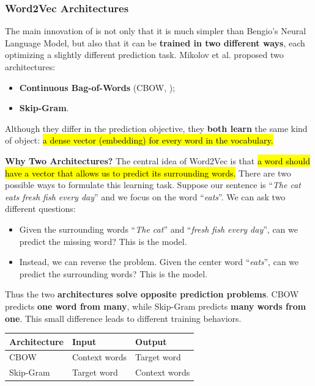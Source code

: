 \subsubsection{Word2Vec Architectures}\label{sec:word2vec-architectures}

The main innovation of  is not only that it is much simpler than Bengio's Neural Language Model, but also that it can be \textbf{trained in two different ways}, each optimizing a slightly different prediction task. Mikolov et al. proposed two architectures:
\begin{itemize}
    \item \textbf{Continuous Bag-of-Words} (CBOW, );
    \item \textbf{Skip-Gram}.
\end{itemize}
Although they differ in the prediction objective, they \textbf{both learn} the same kind of object: \hl{a dense vector (embedding) for every word in the vocabulary.}

\highspace
\textcolor{Green3}{ \textbf{Why Two Architectures?}} The central idea of Word2Vec is that \hl{a word should have a vector that allows us to predict its surrounding words.} There are two possible ways to formulate this learning task. Suppose our sentence is ``\emph{The cat eats fresh fish every day}'' and we focus on the word ``\emph{eats}''. We can ask two different questions:
\begin{itemize}
    \item Given the surrounding words ``\emph{The cat}'' and ``\emph{fresh fish every day}'', can we predict the missing word? This is the  model.
    \item Instead, we can reverse the problem. Given the center word ``\emph{eats}'', can we predict the surrounding words? This is the  model.
\end{itemize}
Thus the two \textbf{architectures solve opposite prediction problems}. CBOW predicts \textbf{one word from many}, while Skip-Gram predicts \textbf{many words from one}. This small difference leads to different training behaviors.

\begin{center}
    \begin{tabular}{@{} l l l @{}}
        \toprule
        \textbf{Architecture} & \textbf{Input} & \textbf{Output} \\
        \midrule
        CBOW & Context words & Target word \\
        Skip-Gram & Target word & Context words \\
        \bottomrule
    \end{tabular}
\end{center}

